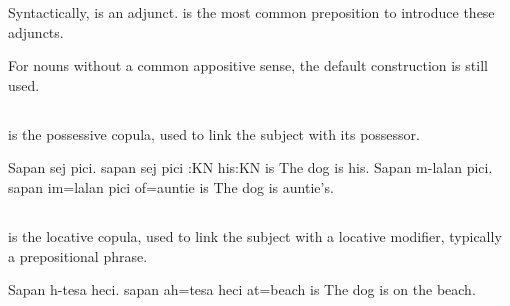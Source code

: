 Syntactically,  is an adjunct.  is the most common preposition to introduce these adjuncts.

For nouns without a common appositive sense, the default  construction is still used.

\subsection{}
 is the possessive copula, used to link the subject with its possessor.

\begin{examples}
    \ex
        \script Sapan sej pici.
        \bits sapan sej pici
        :KN his:KN is
        \tr The dog is his. 
    \ex
        \script Sapan m-lalan pici.
        \bits sapan im=lalan pici
         of=auntie is
        \tr The dog is auntie's.
\end{examples}

\subsection{}
 is the locative copula, used to link the subject with a locative modifier, typically a prepositional phrase.

\begin{example}
    \script Sapan h-tesa heci.
    \bits sapan ah=tesa heci
     at=beach is
    \tr The dog is on the beach.
\end{example}
